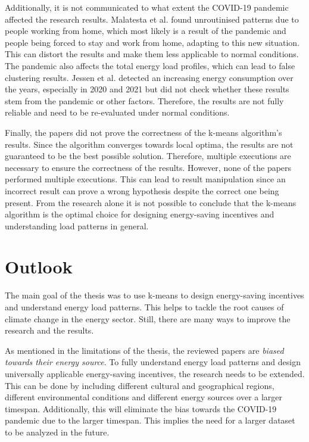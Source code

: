 Additionally, it is not communicated to what extent the COVID-19 pandemic affected the research results.
Malatesta et al. \cite{MAL-HBP} found unroutinised patterns due to people working from home, which most likely is a result of the pandemic and people being forced to stay and work from home, adapting to this new situation.
This can distort the results and make them less applicable to normal conditions.
The pandemic also affects the total energy load profiles, which can lead to false clustering results.
Jessen et al. \cite{JES-IND} detected an increasing energy consumption over the years, especially in 2020 and 2021 but did not check whether these results stem from the pandemic or other factors.
Therefore, the results are not fully reliable and need to be re-evaluated under normal conditions.

Finally, the papers did not prove the correctness of the k-means algorithm's results.
Since the algorithm converges towards local optima, the results are not guaranteed to be the best possible solution.
Therefore, multiple executions are necessary to ensure the correctness of the results.
However, none of the papers performed multiple executions.
This can lead to result manipulation since an incorrect result can prove a wrong hypothesis despite the correct one being present.
From the research alone it is not possible to conclude that the k-means algorithm is the optimal choice for designing energy-saving incentives and understanding load patterns in general.


\section{Outlook}
The main goal of the thesis was to use k-means to design energy-saving incentives and understand energy load patterns.
This helps to tackle the root causes of climate change in the energy sector.
Still, there are many ways to improve the research and the results.

As mentioned in the limitations of the thesis, the reviewed papers are \textit{biased towards their energy source}.
To fully understand energy load patterns and design universally applicable energy-saving incentives, the research needs to be extended.
This can be done by including different cultural and geographical regions, different environmental conditions and different energy sources over a larger timespan.
Additionally, this will eliminate the bias towards the COVID-19 pandemic due to the larger timespan.
This implies the need for a larger dataset to be analyzed in the future.

